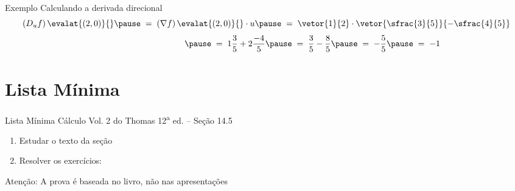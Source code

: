 \begin{frame}{Exemplo \theexemplo}
  Calculando a derivada direcional
  \[
    \left(D_u f\right)\evalat{(2, 0)}{}
    \pause
    \;=\; \left(\nabla f\right)\evalat{(2, 0)}{} \cdot u
    \pause
    \;=\; \vetor{1}{2} \cdot \vetor{\sfrac{3}{5}}{-\sfrac{4}{5}}
  \]
  \[
    \hphantom{\left(D_u f\right)\evalat{(2, 0)}{}}
    \pause
    \;=\; 1 \frac{3}{5} + 2 \frac{-4}{5}
    \pause
    \;=\; \frac{3}{5} - \frac{8}{5}
    \pause
    \;=\; - \frac{5}{5}
    \pause
    \;=\; -1
  \]
\end{frame}

\section{Lista Mínima}

\begin{frame}{Lista Mínima}
  Cálculo Vol. 2 do Thomas 12\textsuperscript{a} ed. -- Seção 14.5
  \begin{enumerate}
    \item Estudar o texto da seção
    \item Resolver os exercícios:
  \end{enumerate}

  \vfill
  Atenção: A prova é baseada no livro, não nas apresentações
\end{frame}


